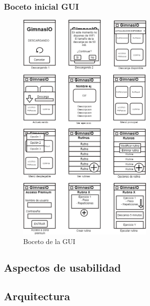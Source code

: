 \documentclass[11pt,a4paper]{report}
\begin{document}
\subsubsection{Boceto inicial GUI}
\begin{figure}[H]
	\centering
	\includegraphics[width=0.6\textwidth]{capturicas/bocGui.png}
	\caption{Boceto de la GUI}
	\label{fig: bocGUI}
\end{figure}
\subsection{Aspectos de usabilidad}
\subsection{Arquitectura}
\end{document}
